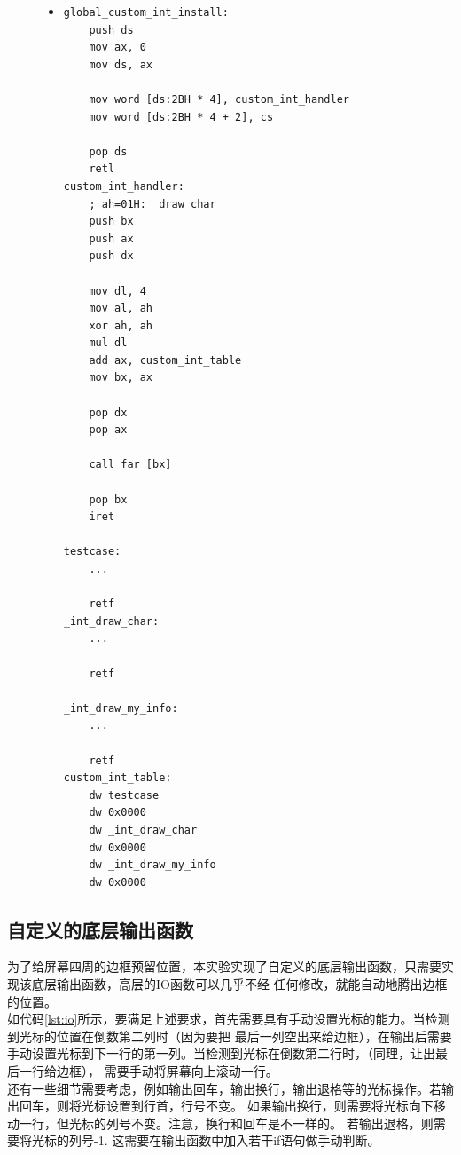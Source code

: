 \documentclass[a4paper]{article}
\begin{document}
    \begin{figure}[!h]
    \begin{itemize}
    \item[] \begin{lstlisting}[language={[x86masm]Assembler}, label=lst:custom_int, caption=用户自定义中断的实现]
global_custom_int_install:
    push ds
    mov ax, 0
    mov ds, ax

    mov word [ds:2BH * 4], custom_int_handler
    mov word [ds:2BH * 4 + 2], cs

    pop ds
    retl
custom_int_handler:
    ; ah=01H: _draw_char
    push bx
    push ax
    push dx 

    mov dl, 4
    mov al, ah
    xor ah, ah
    mul dl
    add ax, custom_int_table
    mov bx, ax

    pop dx
    pop ax

    call far [bx]

    pop bx
    iret

testcase:
    ...

    retf
_int_draw_char:
    ...

    retf

_int_draw_my_info:
    ...

    retf
custom_int_table:
    dw testcase
    dw 0x0000
    dw _int_draw_char
    dw 0x0000
    dw _int_draw_my_info
    dw 0x0000  
    \end{lstlisting}
    \end{itemize}
    \end{figure}


    \subsection{自定义的底层输出函数} \label{sec:low_level}
    为了给屏幕四周的边框预留位置，本实验实现了自定义的底层输出函数，只需要实现该底层输出函数，高层的IO函数可以几乎不经
    任何修改，就能自动地腾出边框的位置。\\
    
    如代码\ref{lst:io}所示，要满足上述要求，首先需要具有手动设置光标的能力。当检测到光标的位置在倒数第二列时（因为要把
    最后一列空出来给边框），在输出后需要手动设置光标到下一行的第一列。当检测到光标在倒数第二行时，（同理，让出最后一行给边框），
    需要手动将屏幕向上滚动一行。\\
    
    还有一些细节需要考虑，例如输出回车，输出换行，输出退格等的光标操作。若输出回车，则将光标设置到行首，行号不变。
    如果输出换行，则需要将光标向下移动一行，但光标的列号不变。注意，换行和回车是不一样的。
    若输出退格，则需要将光标的列号-1.
    这需要在输出函数中加入若干if语句做手动判断。\\
    
\end{document}

